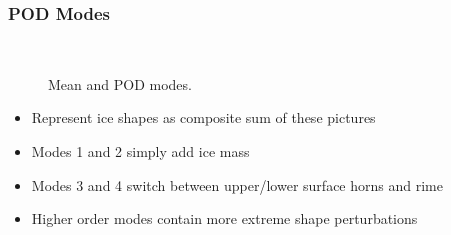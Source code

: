 \documentclass[9pt]{beamer}
\begin{document}
\begin{frame}
\frametitle{POD Modes}
\label{sec-3-5}

\vspace*{0.75cm}\begin{figure}
      \vspace*{-1.75cm} \\
      \vspace*{-0.75cm}
      \vspace*{-0.75cm}
      \vspace*{-0.75cm}
      \vspace*{-0.75cm}
      \vspace*{1cm}\caption{Mean and POD modes.}
\end{figure}

\begin{itemize}
\item Represent ice shapes as composite sum of these pictures
\item Modes 1 and 2 simply add ice mass
\item Modes 3 and 4 switch between upper/lower surface horns and rime
\item Higher order modes contain more extreme shape perturbations
\end{itemize}
\end{frame}
\end{document}
